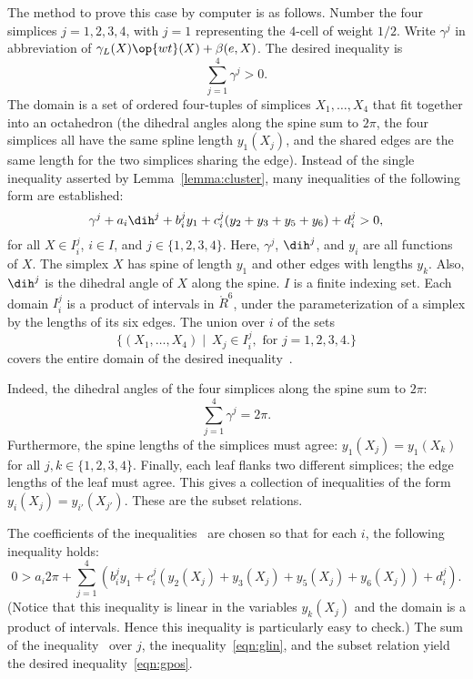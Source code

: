 {The method to prove this case by computer is as follows.  Number the
four simplices $j=1,2,3,4$, with $j=1$ representing the $4$-cell of
weight $1/2$.  Write $\gamma^j$ in abbreviation of
$\gamma_L(X)\op{wt}(X) + \beta(e,X)$.  The desired inequality is
\begin{equation}\label{eqn:gpos} 
\sum_{j=1}^4 \gamma^j > 0.
\end{equation}
The domain is a set of ordered four-tuples of simplices
$X_1,\ldots,X_4$ that fit together into an octahedron (the dihedral
angles along the spine sum to $2\pi$, the four simplices all have the
same spline length $y_1(X_j)$, and the shared edges are the same
length for the two simplices sharing the edge).  Instead of the single
inequality asserted by Lemma~\ref{lemma:cluster}, many inequalities of
the following form are established:
\begin{equation}\label{eqn:gpart} 
\gamma^j + a_i \dih^j + b_i^j y_1 + c_i^j (y_2+y_3+y_5+y_6) + d_i^j > 0, 
\end{equation}
for all $X \in I_i^j$, \quad $i \in I$, and $j\in \{1,2,3,4\}$.  Here,
$\gamma^j$, $\dih^j$, and $y_i$ are all functions of $X$.  The simplex
$X$ has spine of length $y_1$ and other edges with lengths $y_k$.
Also, $\dih^j$ is the dihedral angle of $X$ along the spine.  $I$ is a
finite indexing set.  Each domain $I_i^j$ is a product of intervals in
$\ring{R}^6$, under the parameterization of a simplex by the lengths
of its six edges.  The union over $i$ of the sets
\begin{displaymath} 
\{(X_1,\ldots,X_4)\mid~ X_j \in I_i^j,\text{ for } j=1,2,3,4.\}
\end{displaymath}
covers the entire domain of the desired inequality~.   

  Indeed, the
dihedral angles of the four simplices along the spine sum to $2\pi$:
\begin{displaymath} 
\sum_{j=1}^4 \gamma^j = 2\pi.
\end{displaymath}
Furthermore, the spine lengths of the simplices must agree: $y_1(X_j)
= y_1(X_k)$ for all $j,k\in\{1,2,3,4\}$.  Finally, each leaf flanks
two different simplices; the edge lengths of the leaf must agree.
This gives a collection of inequalities of the form $y_i(X_j) =
y_{i'}(X_{j'})$.  These are the subset relations.

The coefficients of the inequalities~
are chosen so that for each $i$, the following inequality holds:
\begin{equation}\label{eqn:glin} 
0 > a_i 2\pi + 
\sum_{j=1}^4 (b_i^j y_1 +  c_i^j (y_2(X_j)+y_3(X_j)+y_5(X_j)+y_6(X_j)) + d_i^j).
\end{equation}
(Notice that this inequality is linear in the variables $y_k(X_j)$ and
the domain is a product of intervals.  Hence this inequality is
particularly easy to check.)  The sum of the
inequality~ over $j$, the inequality~\ref{eqn:glin},
and the subset relation yield the desired inequality~\ref{eqn:gpos}.

}
